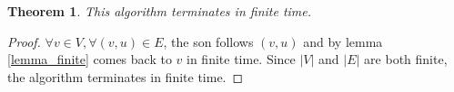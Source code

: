 \documentclass{article}
\newtheorem{theorem}{Theorem}
\begin{document}
\begin{theorem}This algorithm terminates in finite time.\end{theorem}
\begin{proof} $\forall v\in V, \forall (v,u)\in E$, the son follows $(v,u)$ and by lemma \ref{lemma_finite} comes back to $v$ in finite time. Since $|V|$ and $|E|$ are both finite, the algorithm terminates in finite time.

\end{proof}
\end{document}
